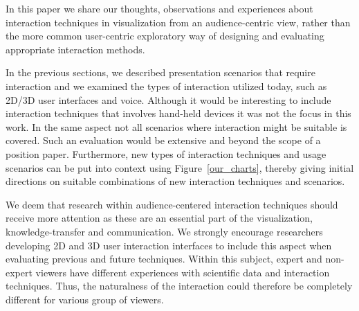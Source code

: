 \documentclass[review,journal]{vgtc}         %
\begin{document}
In this paper we share our thoughts, observations and experiences about interaction techniques in visualization from an audience-centric view, rather than the more common user-centric exploratory way of designing and evaluating appropriate interaction methods.

In the previous sections, we described presentation scenarios that require interaction and we examined the types of interaction utilized today, such as 2D/3D user interfaces and voice.
Although it would be interesting to include interaction techniques that involves hand-held devices it was not the focus in this work.
In the same aspect not all scenarios where interaction might be suitable is covered.
Such an evaluation would be extensive and beyond the scope of a position paper.
Furthermore, new types of interaction techniques and usage scenarios can be put into context using Figure~\ref{our_charts}, thereby giving initial directions on suitable combinations of new interaction techniques and scenarios.

We deem that research within audience-centered interaction techniques should receive more attention as these are an essential part of the visualization, knowledge-transfer and communication. 
We strongly encourage researchers developing 2D and 3D user interaction interfaces to include this aspect when evaluating previous and future techniques.
Within this subject, expert and non-expert viewers have different experiences with scientific data and interaction techniques. Thus, the naturalness of the interaction could therefore be completely different for various group of viewers.


\end{document}
